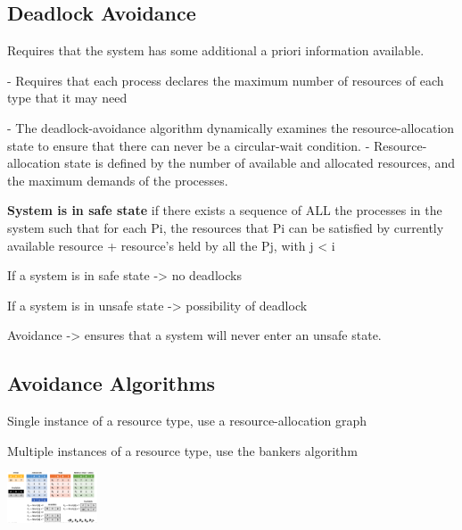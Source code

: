  \subsection{Deadlock Avoidance}

 Requires that the system has some additional a priori information available.\par
 - Requires that each process declares the maximum number of resources of each type that it may need\par
 - The deadlock-avoidance algorithm dynamically examines the resource-allocation state to ensure that there can never be a circular-wait condition.
 - Resource-allocation state is defined by the number of available and allocated resources, and the maximum demands of the processes.\par

 \textbf{System is in safe state} if there exists a sequence of ALL the processes in the system such that for each Pi, the resources that Pi can be satisfied by currently available resource + resource's held by all the Pj, with j < i \par

 If a system is in safe state -> no deadlocks\par
 If a system is in unsafe state -> possibility of deadlock\par
 Avoidance -> ensures that a system will never enter an unsafe state.


\subsection{Avoidance Algorithms}

Single instance of a resource type, use a resource-allocation graph\par
Multiple instances of a resource type, use the bankers algorithm\par

\includegraphics[width=0.20\textwidth]{concurrency-errors/bankers.png}